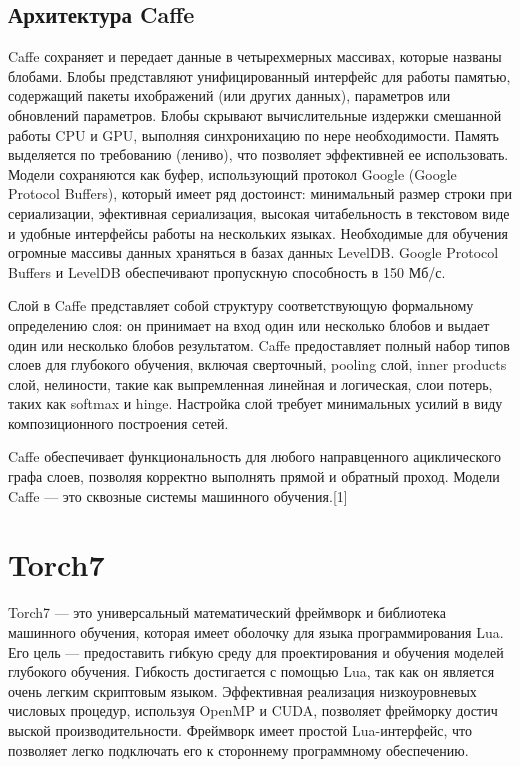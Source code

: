 \documentclass[a4paper,english,russian]{G2-105}
\begin{document}
\subsection{Архитектура Caffe}
\par Caffe сохраняет и передает данные в четырехмерных массивах, которые названы блобами. Блобы представляют унифицированный интерфейс для работы  памятью, содержащий пакеты ихображений (или других данных), параметров или обновлений параметров. Блобы скрывают вычислительные издержки смешанной работы CPU и GPU, выполняя синхронихацию по нере необходимости. Память выделяется по требованию (лениво), что позволяет эффективней ее использовать. Модели сохраняются как буфер, использующий протокол Google (Google Protocol Buffers), который имеет ряд достоинст: минимальный размер строки при сериализации, эфективная сериализация, высокая читабельность в текстовом виде и удобные интерфейсы работы на нескольких языках. Необходимые для обучения огромные массивы данных храняться в базах данныx LevelDB. Google Protocol Buffers и LevelDB обеспечивают пропускную способность в 150 Мб/с. 
\par Слой в Caffe представляет собой структуру соответствующую формальному определению слоя: он принимает на вход один или несколько блобов и выдает один или несколько блобов результатом. Caffe предоставляет полный набор типов слоев для глубокого обучения, включая сверточный, pooling слой, inner products слой, нелиности, такие как выпремленная линейная и логическая, слои потерь, таких как softmax и hinge. Настройка слой требует минимальных усилий в виду композиционного построения сетей.
\par Caffe обеспечивает функциональность для любого направценного ациклического графа слоев, позволяя корректно выполнять прямой и обратный проход. Модели Caffe --- это сквозные системы машинного обучения.[1]

\section{Torch7}
\par Torch7 --- это универсальный математический фреймворк и библиотека машинного обучения, которая имеет оболочку для языка программирования Lua. Его цель --- предоставить гибкую среду для проектирования и обучения моделей глубокого обучения. Гибкость достигается с помощью Lua, так как он является очень легким скриптовым языком. Эффективная реализация низкоуровневых числовых процедур, используя OpenMP и CUDA, позволяет фрейморку достич выской производительности. Фреймворк имеет простой Lua-интерфейс, что позволяет легко подключать его к стороннему программному обеспечению.
\end{document}
